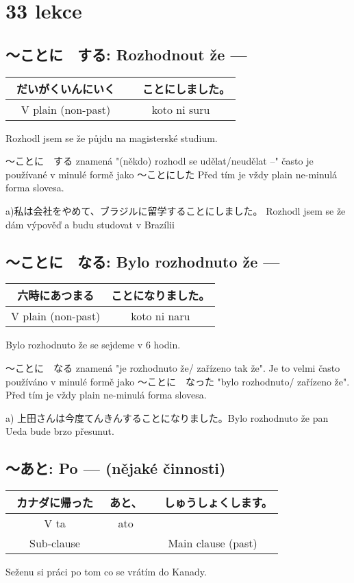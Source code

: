 
\section{33 lekce}
\label{sec:lekce_33}

\subsection{〜ことに　する: Rozhodnout že ---}
\begin{center}
\begin{tabular}{||c|c||}
\hline
だいがくいんにいく　&　ことにしました。\\
\hline
V plain (non-past)&koto ni suru\\
\hline
\end{tabular}
\end{center}
Rozhodl jsem se že půjdu na magisterské studium.

〜ことに　する znamená "(někdo) rozhodl se udělat/neudělat --" často je používané v minulé formě jako 〜ことにした Před tím je vždy plain ne-minulá forma slovesa.

a)私は会社をやめて、ブラジルに留学することにしました。  Rozhodl jsem se že dám výpověď a budu studovat v Brazílii


\subsection{〜ことに　なる: Bylo rozhodnuto že ---}
\begin{center}
\begin{tabular}{||c|c||}
\hline
六時にあつまる　&ことになりました。\\
\hline
V plain (non-past) & koto ni naru\\
\hline
\end{tabular}
\end{center}
Bylo rozhodnuto že se sejdeme v 6 hodin.

〜ことに　なる znamená "je rozhodnuto že/ zařízeno tak že". Je to velmi často používáno v minulé formě jako 〜ことに　なった "bylo rozhodnuto/ zařízeno že". Před tím je vždy plain ne-minulá forma slovesa.

a) 上田さんは今度てんきんすることになりました。Bylo rozhodnuto že pan Ueda bude brzo přesunut.



\subsection{〜あと: Po --- (nějaké činnosti)}
\begin{center}
\begin{tabular}{||c|c||c||}
\hline
カナダに帰った　&あと、&　しゅうしょくします。\\
\hline
V ta&ato&\\
Sub-clause&&Main clause (past)\\
\hline
\end{tabular}
\end{center}
Seženu si práci po tom co se vrátím do Kanady.

